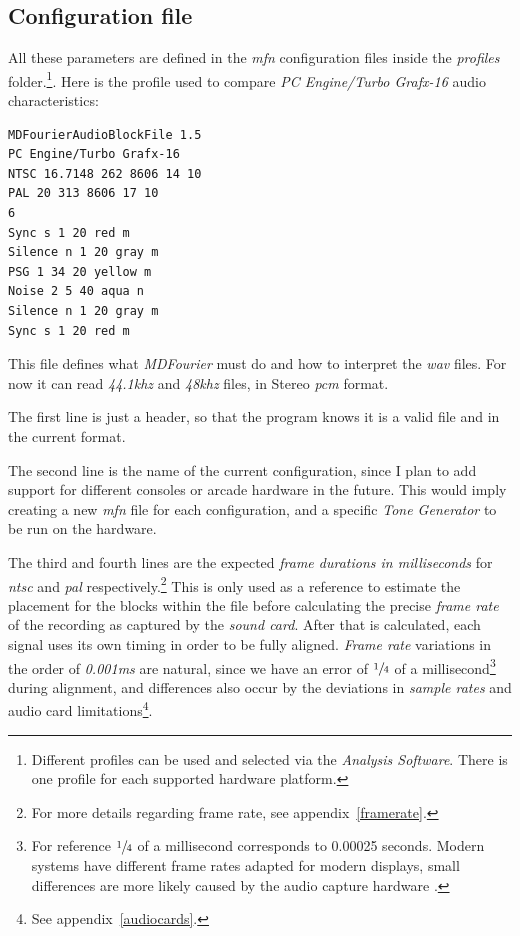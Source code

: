 \documentclass[10pt,a4paper]{report}
\newcommand{\ac}[1]{\textit{\mbox{\acrshort{#1}}}}
\newcommand{\khz}[1]{\textit{\mbox{#1\acrshort{khz}}}}
\begin{document}
\begin{appendices}
\chapter{Configuration file}
\label{mfnconfig}

All these parameters are defined in the \textit{mfn} configuration files inside the \textit{profiles} folder.\footnote{Different profiles can be used and selected via the \textit{Analysis Software}. There is one profile for each supported hardware platform.}. Here is the profile used to compare \textit{PC Engine/Turbo Grafx-16} audio characteristics:

\begin{verbatim}
MDFourierAudioBlockFile 1.5
PC Engine/Turbo Grafx-16
NTSC 16.7148 262 8606 14 10
PAL 20 313 8606 17 10
6
Sync s 1 20 red m
Silence n 1 20 gray m
PSG 1 34 20 yellow m
Noise 2 5 40 aqua n
Silence n 1 20 gray m
Sync s 1 20 red m
\end{verbatim}

This file defines what \textit{MDFourier} must do and how to interpret the \ac{wav} files. For now it can read \khz{44.1} and \khz{48} files, in Stereo \ac{pcm} format.

The first line is just a header, so that the program knows it is a valid file and in the current format.

The second line is the name of the current configuration, since I plan to add support for different consoles or arcade hardware in the future. This would imply creating a new \textit{mfn} file for each configuration, and a specific \textit{Tone Generator} to be run on the hardware.

The third and fourth lines are the expected \textit{frame durations in milliseconds} for \ac{ntsc} and \ac{pal} respectively.\footnote{For more details regarding frame rate, see appendix~\ref{framerate}.} This is only used as a reference to estimate the placement for the blocks within the file before calculating the precise \textit{frame rate} of the recording as captured by the \textit{sound card}. After that is calculated, each signal uses its own timing in order to be fully aligned. \textit{Frame rate} variations in the order of \textit{0.001}\ac{ms} are natural, since we have an error of $\sfrac{1}{4}$ of a millisecond\footnote{For reference $\sfrac{1}{4}$ of a millisecond corresponds to 0.00025 seconds. Modern systems have different frame rates adapted for modern displays, small differences are more likely caused by the audio capture hardware \cite{SoundCardClock}.} during alignment, and differences also occur by the deviations in \textit{sample rates} and audio card limitations\footnote{See appendix~\ref{audiocards}.}.


\end{appendices}
\end{document}
